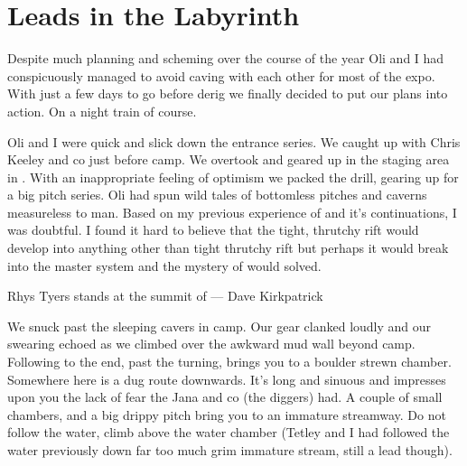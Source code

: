 \section{Leads in the Labyrinth}
 
Despite much planning and scheming over the course of the year Oli and I had conspicuously managed to avoid caving with each other for most of the expo. With just a few days to go before derig we finally decided to put our plans into action. On a night train of course.
 
Oli and I were quick and slick down the entrance series. We caught up with Chris Keeley and co just before camp. We overtook and geared up in the staging area in . With an inappropriate feeling of optimism we packed the drill, gearing up for a big pitch series. Oli had spun wild tales of bottomless pitches and caverns measureless to man. Based on my previous experience of  and it's continuations, I was doubtful. I found it hard to believe that the tight, thrutchy rift would develop into anything other than tight thrutchy rift but perhaps it would break into the master system and the mystery of  would solved. 


 \begin{marginfigure}
\centering
{}
\label{Rhys Skrbina}
\caption{Rhys Tyers stands at the summit of \protect{} --- Dave Kirkpatrick}
\end{marginfigure}

 
We snuck past the sleeping cavers in camp. Our gear clanked loudly and our swearing echoed as we climbed over the awkward mud wall beyond camp. Following  to the end, past the  turning, brings you to a boulder strewn chamber. Somewhere here is a dug route downwards. It's long and sinuous and impresses upon you the lack of fear the Jana and co (the diggers) had. A couple of small chambers, and a big drippy pitch bring you to an immature streamway. Do not follow the water, climb above the water chamber (Tetley and I had followed the water previously down far too much grim immature stream, still a lead though). 
 
